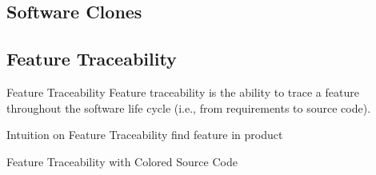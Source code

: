 \subsection{Software Clones}
\begin{frame}{\myframetitle}
	\frameSoftwareClones
\end{frame}

\subsection{Feature Traceability}
\begin{frame}{\myframetitle}
	\begin{mycolumns}[widths={40}]
		\begin{definition}{Feature Traceability}
			Feature traceability is the ability to trace a feature throughout the software life cycle (i.e., from requirements to source code).
		\end{definition}
		\begin{example}{Intuition on Feature Traceability}
			find feature  in product 
		\end{example}
	\mynextcolumn
		\begin{exampletight}{Feature Traceability with Colored Source Code}
		\end{exampletight}
	\end{mycolumns}
\end{frame}

